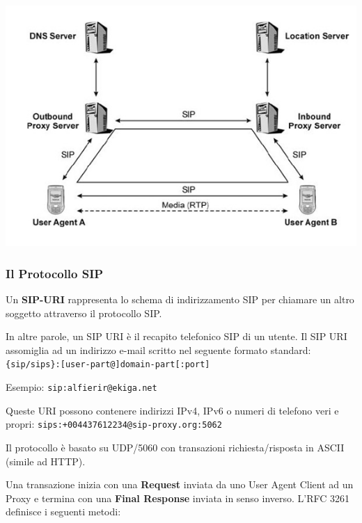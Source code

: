             \begin{center}
                \includegraphics[scale=0.5]{chapters/6/assets/schema_ze.png}
            \end{center}

        \subsubsection{Il Protocollo SIP}
            Un \textbf{SIP-URI} rappresenta lo schema di indirizzamento SIP per chiamare un altro soggetto attraverso il protocollo SIP.
        
            In altre parole, un SIP URI è il recapito telefonico SIP di un utente. Il SIP URI assomiglia ad un indirizzo e-mail scritto nel seguente formato standard: \verb|{sip/sips}:[user-part@]domain-part[:port]|
        
            Esempio: \verb|sip:alfierir@ekiga.net|
        
            Queste URI possono contenere indirizzi IPv4, IPv6 o numeri di telefono veri e propri: \verb|sips:+004437612234@sip-proxy.org:5062|

            Il protocollo è basato su UDP/5060 con transazioni richiesta/risposta in ASCII (simile ad HTTP).

            Una transazione inizia con una \textbf{Request} inviata da uno User Agent Client ad un Proxy e termina con una \textbf{Final Response} inviata in senso inverso. L'RFC 3261 definisce i seguenti metodi:

